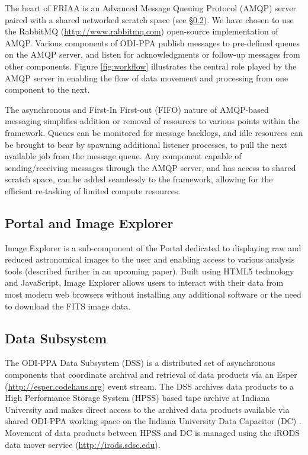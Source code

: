 The heart of FRIAA is an Advanced Message Queuing Protocol (AMQP) server \citep{amqp} paired with a shared networked scratch space (see \S\ref{section:dss}).  We have chosen to use the RabbitMQ (\url{http://www.rabbitmq.com}) open-source implementation of AMQP.  Various components of ODI-PPA publish messages to pre-defined queues on the AMQP server, and listen for acknowledgments or follow-up messages from other components.    Figure \ref{fig:workflow} illustrates the central role played by the AMQP server in enabling the flow of data movement and processing from one component to the next.  

The asynchronous and First-In First-out (FIFO) nature of AMQP-based messaging simplifies addition or removal of resources to various points within the framework.  Queues can be monitored for message backlogs, and idle resources can be brought to bear by spawning additional listener processes, to pull the next available job from the message queue.  Any component capable of sending/receiving messages through the AMQP server, and has access to shared scratch space, can be added seamlessly to the framework, allowing for the efficient re-tasking of limited compute resources.

\subsection{Portal and Image Explorer}
\label{section:portal}

Image Explorer is a sub-component of the Portal dedicated to displaying raw and reduced astronomical images to the user and enabling access to various analysis tools (described further in an upcoming paper).   Built using HTML5 technology and JavaScript, Image Explorer allows users to interact with their data from most modern web browsers without installing any additional software or the need to download the FITS image data.

\subsection{Data Subsystem}
\label{section:dss}

The ODI-PPA Data Subsystem (DSS) is a distributed set of asynchronous components that coordinate archival and retrieval of data products via an Esper (\url{http://esper.codehaus.org}) event stream. The DSS archives data products to a High Performance Storage System (HPSS) based tape archive \citep{hpss} at Indiana University and makes direct access to the archived data products available via shared ODI-PPA working space on the Indiana University Data Capacitor (DC) \citep{dataCapacitor}.  Movement of data products between HPSS and DC is managed using the iRODS data mover service (\url{http://irods.sdsc.edu}).  

